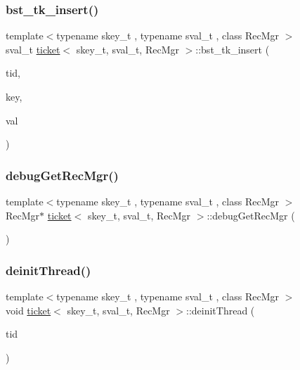 \subsubsection{\texorpdfstring{bst\+\_\+tk\+\_\+insert()}{bst\_tk\_insert()}}
{\footnotesize\ttfamily template$<$typename skey\+\_\+t , typename sval\+\_\+t , class Rec\+Mgr $>$ \\
sval\+\_\+t \hyperlink{classticket}{ticket}$<$ skey\+\_\+t, sval\+\_\+t, Rec\+Mgr $>$\+::bst\+\_\+tk\+\_\+insert (\begin{DoxyParamCaption}\item[{const int}]{tid,  }\item[{skey\+\_\+t}]{key,  }\item[{sval\+\_\+t}]{val }\end{DoxyParamCaption})}

\mbox{\label{classticket_abc8a9c97c3e1ae76f106f4f8eba0e6f0}} 
\subsubsection{\texorpdfstring{debug\+Get\+Rec\+Mgr()}{debugGetRecMgr()}}
{\footnotesize\ttfamily template$<$typename skey\+\_\+t , typename sval\+\_\+t , class Rec\+Mgr $>$ \\
Rec\+Mgr$\ast$ \hyperlink{classticket}{ticket}$<$ skey\+\_\+t, sval\+\_\+t, Rec\+Mgr $>$\+::debug\+Get\+Rec\+Mgr (\begin{DoxyParamCaption}{ }\end{DoxyParamCaption})\hspace{0.3cm}{\ttfamily [inline]}}

\mbox{\label{classticket_a7fdba09ca002de28d968fb5e2540dc45}} 
\subsubsection{\texorpdfstring{deinit\+Thread()}{deinitThread()}}
{\footnotesize\ttfamily template$<$typename skey\+\_\+t , typename sval\+\_\+t , class Rec\+Mgr $>$ \\
void \hyperlink{classticket}{ticket}$<$ skey\+\_\+t, sval\+\_\+t, Rec\+Mgr $>$\+::deinit\+Thread (\begin{DoxyParamCaption}\item[{const int}]{tid }\end{DoxyParamCaption})\hspace{0.3cm}{\ttfamily [inline]}}


